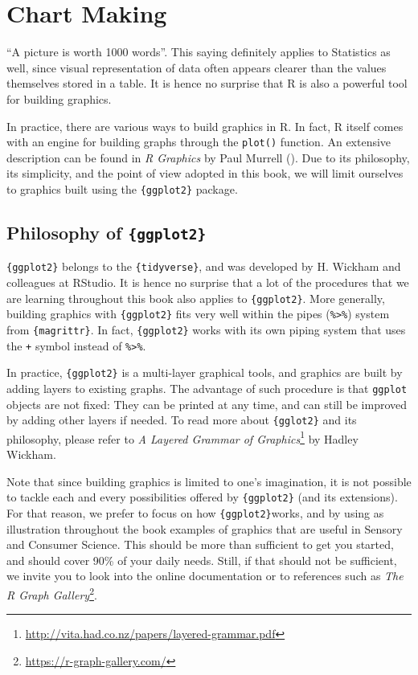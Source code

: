 \documentclass[
]{krantz}
\renewcommand{\href}[2]{#2\footnote{\url{#1}}}
\begin{document}
\hypertarget{chart-making}{%
\section{Chart Making}\label{chart-making}}

``A picture is worth 1000 words''. This saying definitely applies to Statistics as well, since visual representation of data often appears clearer than the values themselves stored in a table. It is hence no surprise that R is also a powerful tool for building graphics.

In practice, there are various ways to build graphics in R. In fact, R itself comes with an engine for building graphs through the \texttt{plot()} function. An extensive description can be found in \emph{R Graphics} by Paul Murrell (\citet{Murrell2011}). Due to its philosophy, its simplicity, and the point of view adopted in this book, we will limit ourselves to graphics built using the \texttt{\{ggplot2\}} package.

\hypertarget{philosophy-of-ggplot2}{%
\subsection{\texorpdfstring{Philosophy of \texttt{\{ggplot2\}}}{Philosophy of \{ggplot2\}}}\label{philosophy-of-ggplot2}}

\texttt{\{ggplot2\}} belongs to the \texttt{\{tidyverse\}}, and was developed by H. Wickham and colleagues at RStudio. It is hence no surprise that a lot of the procedures that we are learning throughout this book also applies to \texttt{\{ggplot2\}}. More generally, building graphics with \texttt{\{ggplot2\}} fits very well within the pipes (\texttt{\%\textgreater{}\%}) system from \texttt{\{magrittr\}}. In fact, \texttt{\{ggplot2\}} works with its own piping system that uses the \texttt{+} symbol instead of \texttt{\%\textgreater{}\%}.

In practice, \texttt{\{ggplot2\}} is a multi-layer graphical tools, and graphics are built by adding layers to existing graphs. The advantage of such procedure is that \texttt{ggplot} objects are not fixed: They can be printed at any time, and can still be improved by adding other layers if needed. To read more about \texttt{\{gglot2\}} and its philosophy, please refer to
\href{http://vita.had.co.nz/papers/layered-grammar.pdf}{\emph{A Layered Grammar of Graphics}} by Hadley Wickham.

Note that since building graphics is limited to one's imagination, it is not possible to tackle each and every possibilities offered by \texttt{\{ggplot2\}} (and its extensions). For that reason, we prefer to focus on how \texttt{\{ggplot2\}}works, and by using as illustration throughout the book examples of graphics that are useful in Sensory and Consumer Science. This should be more than sufficient to get you started, and should cover 90\% of your daily needs. Still, if that should not be sufficient, we invite you to look into the online documentation or to references such as \href{https://r-graph-gallery.com/}{\emph{The R Graph Gallery}}.
\end{document}
